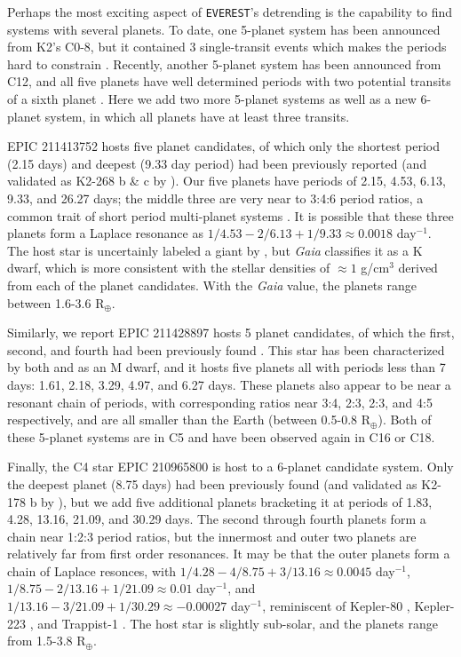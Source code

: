 \documentclass[twocolumn]{aastex62}
\newcommand{\project}[1]{\textsl{#1}}
\newcommand{\pipeline}[1]{\texttt{#1}}
\begin{document}
Perhaps the most exciting aspect of \pipeline{EVEREST}'s detrending is
the capability to find systems with several planets. To date, one
5-planet system has been announced from K2's C0-8, but it contained 3
single-transit events which makes the periods hard to constrain
\citep[and also caused our search to miss them;][]{van16a}. Recently,
another 5-planet system has been announced from C12, and all five
planets have well determined periods with two potential transits of a
sixth planet \citep{chr18}.  Here we add two more 5-planet systems as
well as a new 6-planet system, in which all planets have at least
three transits.

EPIC 211413752 hosts five planet candidates, of which only the
shortest period (2.15 days) and deepest (9.33 day period) had been
previously reported (and validated as K2-268 b \& c by
\cite{liv18}). Our five planets have periods of 2.15, 4.53, 6.13,
9.33, and 26.27 days; the middle three are very near to 3:4:6 period
ratios, a common trait of short period multi-planet systems
\citep{fab14}.  It is possible that these three planets form a Laplace
resonance as $1/4.53 - 2/6.13 + 1/9.33 \approx 0.0018$ day$^{-1}$.
The host star is uncertainly labeled a giant by \cite{hub16}, but
\project{Gaia} classifies it as a K dwarf, which is more consistent
with the stellar densities of $\approx1$ g/cm$^3$ derived from each of
the planet candidates. With the \project{Gaia} value, the planets
range between 1.6-3.6 R$_\oplus$.

Similarly, we report EPIC 211428897 hosts 5 planet candidates, of
which the first, second, and fourth had been previously found
\citep{dre17}. This star has been characterized by both \cite{dre17}
and \cite{hub16} as an M dwarf, and it hosts five planets all with
periods less than 7 days: 1.61, 2.18, 3.29, 4.97, and 6.27 days. These
planets also appear to be near a resonant chain of periods, with
corresponding ratios near 3:4, 2:3, 2:3, and 4:5 respectively, and are
all smaller than the Earth (between 0.5-0.8 R$_\oplus$).  Both of
these 5-planet systems are in C5 and have been observed again in C16
or C18.

Finally, the C4 star EPIC 210965800 is host to a 6-planet candidate
system. Only the deepest planet (8.75 days) had been previously found
(and validated as K2-178 b by \cite{may18}), but we add five
additional planets bracketing it at periods of 1.83, 4.28, 13.16,
21.09, and 30.29 days. The second through fourth planets form a chain
near 1:2:3 period ratios, but the innermost and outer two planets are
relatively far from first order resonances.  It may be that the outer
planets form a chain of Laplace resonces, with $1/4.28-4/8.75+3/13.16
\approx 0.0045$ day$^{-1}$, $1/8.75-2/13.16+1/21.09 \approx 0.01$
day$^{-1}$, and $1/13.16-3/21.09+1/30.29 \approx -0.00027$ day$^{-1}$,
reminiscent of Kepler-80 \citep{mac16}, Kepler-223 \citep{mil16}, and
Trappist-1 \citep{lug17}.  The host star is slightly sub-solar, and
the planets range from 1.5-3.8 R$_\oplus$.
\end{document}
